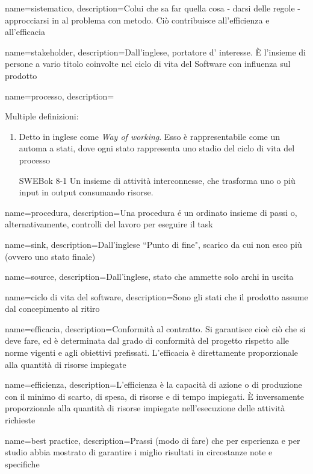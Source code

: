 {
name=sistematico,
description={Colui che sa far quella cosa - darsi delle regole - approcciarsi in al problema con metodo. Ci\`o contribuisce all'efficienza e all'efficacia}
}

{
name=stakeholder,
description={Dall'inglese, portatore d' interesse. È l'insieme di persone a vario titolo coinvolte nel ciclo di vita del Software con influenza sul prodotto}
}

{
name=processo, 
description={Multiple definizioni:
\begin{enumerate}
\item Detto in inglese come \textit{Way of working}. Esso \`e rappresentabile come un automa a stati, dove ogni stato rappresenta uno stadio del ciclo di vita del processo
\item [SWEBok 8-1] Un insieme di attività interconnesse, che trasforma uno o più input in output consumando risorse.
\end{enumerate}
}
}

{
name=procedura,
description={Una procedura \'e un ordinato insieme di passi o, alternativamente, controlli del lavoro per eseguire il task}
}


{
name=sink,
description={Dall'inglese ``Punto di fine", scarico da cui non esco pi\`u (ovvero uno stato finale)}
}

{
name=source,
description={Dall'inglese, stato che ammette solo archi in uscita}
}

{
name=ciclo di vita del software,
description={Sono gli stati che il prodotto assume dal concepimento al ritiro}
}

{
name=efficacia,
description={Conformit\`a al contratto. Si garantisce cio\`e ci\`o che si deve fare, ed \`e determinata dal grado di conformit\`a del progetto rispetto alle norme vigenti e agli obiettivi prefissati. L'efficacia \`e direttamente proporzionale alla quantit\`a di risorse impiegate}
}

{
name=efficienza,
description={L'efficienza \`e la capacit\`a di azione o di produzione con il minimo di scarto, di spesa, di risorse e di tempo impiegati. \`E inversamente proporzionale alla quantit\`a di risorse impiegate nell'esecuzione delle attivit\`a richieste}
}

{
name=best practice,
description={Prassi (modo di fare) che per esperienza e per studio abbia mostrato di garantire i miglio risultati in circostanze note e specifiche}
}

